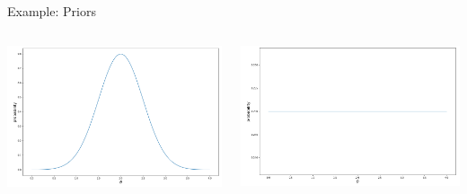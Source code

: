 \documentclass[12pt, aspectratio=149]{beamer}
\theoremstyle{plain}
\begin{document}
\begin{frame}[fragile]{Example: Priors}
\begin{columns}
        \begin{center}
            \includegraphics[scale=0.6]{figs/linreg_theta1_example.png}
        \end{center}
        \begin{center}
             \includegraphics[scale=0.6]{figs/linreg_theta2_example.png} 
        \end{center}
\end{columns}
\end{frame}
\end{document}
